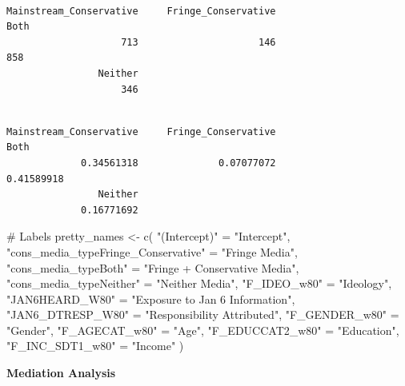 \documentclass[
  letterpaper,
  DIV=11,
  numbers=noendperiod]{scrartcl}
\newenvironment{Shaded}{\begin{snugshade}}{\end{snugshade}}
\newcommand{\CommentTok}[1]{\textcolor[rgb]{0.37,0.37,0.37}{#1}}
\newcommand{\FunctionTok}[1]{\textcolor[rgb]{0.28,0.35,0.67}{#1}}
\newcommand{\NormalTok}[1]{\textcolor[rgb]{0.00,0.23,0.31}{#1}}
\newcommand{\OtherTok}[1]{\textcolor[rgb]{0.00,0.23,0.31}{#1}}
\newcommand{\SpecialCharTok}[1]{\textcolor[rgb]{0.37,0.37,0.37}{#1}}
\newcommand{\StringTok}[1]{\textcolor[rgb]{0.13,0.47,0.30}{#1}}
\begin{document}
\begin{verbatim}

Mainstream_Conservative     Fringe_Conservative                    Both 
                    713                     146                     858 
                Neither 
                    346 
\end{verbatim}

\begin{Shaded}
\end{Shaded}

\begin{verbatim}

Mainstream_Conservative     Fringe_Conservative                    Both 
             0.34561318              0.07077072              0.41589918 
                Neither 
             0.16771692 
\end{verbatim}

\begin{Shaded}
\begin{Highlighting}[]
\CommentTok{\# Labels}
\NormalTok{pretty\_names }\OtherTok{\textless{}{-}} \FunctionTok{c}\NormalTok{(}
  \StringTok{"(Intercept)"} \OtherTok{=} \StringTok{"Intercept"}\NormalTok{,}
  \StringTok{"cons\_media\_typeFringe\_Conservative"} \OtherTok{=} \StringTok{"Fringe Media"}\NormalTok{,}
  \StringTok{"cons\_media\_typeBoth"} \OtherTok{=} \StringTok{"Fringe + Conservative Media"}\NormalTok{,}
  \StringTok{"cons\_media\_typeNeither"} \OtherTok{=} \StringTok{"Neither Media"}\NormalTok{,}
  \StringTok{"F\_IDEO\_w80"} \OtherTok{=} \StringTok{"Ideology"}\NormalTok{,}
  \StringTok{"JAN6HEARD\_W80"} \OtherTok{=} \StringTok{"Exposure to Jan 6 Information"}\NormalTok{,}
  \StringTok{"JAN6\_DTRESP\_W80"} \OtherTok{=} \StringTok{"Responsibility Attributed"}\NormalTok{,}
  \StringTok{"F\_GENDER\_w80"} \OtherTok{=} \StringTok{"Gender"}\NormalTok{,}
  \StringTok{"F\_AGECAT\_w80"} \OtherTok{=} \StringTok{"Age"}\NormalTok{,}
  \StringTok{"F\_EDUCCAT2\_w80"} \OtherTok{=} \StringTok{"Education"}\NormalTok{,}
  \StringTok{"F\_INC\_SDT1\_w80"} \OtherTok{=} \StringTok{"Income"}
\NormalTok{)}
\end{Highlighting}
\end{Shaded}

\textbf{Mediation Analysis}
\end{document}
